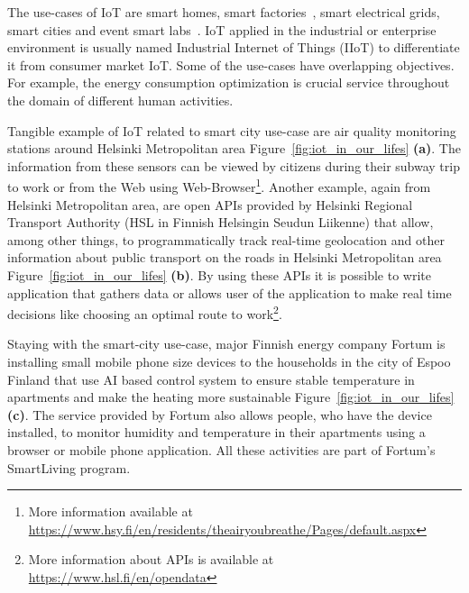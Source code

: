 \documentclass[english, 12pt, a4paper, elec, utf8, online]{aaltothesis}
\begin{document}
The use-cases of IoT are smart homes, smart factories~\cite{wang2016implementing}, smart electrical grids, smart cities and event smart labs~\cite{perkel2017internet}. IoT applied in the industrial or enterprise environment is usually named Industrial Internet of Things (IIoT) to differentiate it from consumer market IoT. Some of the use-cases have overlapping objectives. For example, the energy consumption optimization is crucial service throughout the domain of different human activities.

Tangible example of IoT related to smart city use-case are air quality monitoring stations around Helsinki Metropolitan area Figure~\ref{fig:iot_in_our_lifes} \textbf{(a)}. The information from these sensors can be viewed by citizens during their subway trip to work or from the Web using Web-Browser\footnote{More information available at \url{https://www.hsy.fi/en/residents/theairyoubreathe/Pages/default.aspx}}. Another example, again from Helsinki Metropolitan area, are open APIs provided by Helsinki Regional Transport Authority (HSL in Finnish Helsingin Seudun Liikenne) that allow, among other things, to programmatically track real-time geolocation and other information about public transport on the roads in Helsinki Metropolitan area Figure~\ref{fig:iot_in_our_lifes} \textbf{(b)}. By using these APIs it is possible to write application that gathers data or allows user of the application to make real time decisions like choosing an optimal route to work\footnote{More information about APIs is available at \url{https://www.hsl.fi/en/opendata}}.  

Staying with the smart-city use-case, major Finnish energy company Fortum is installing small mobile phone size devices to the households in the city of Espoo Finland that use AI based control system to ensure stable temperature in apartments and make the heating more sustainable Figure~\ref{fig:iot_in_our_lifes} \textbf{(c)}. The service provided by Fortum also allows people, who have the device installed, to monitor humidity and temperature in their apartments using a browser or mobile phone application. All these activities are part of Fortum's SmartLiving program.   
\end{document}
